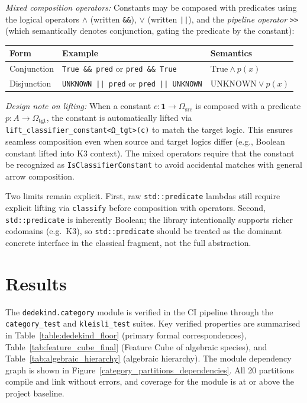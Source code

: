\documentclass[11pt, a4paper]{report}
\begin{document}
\textit{Mixed composition operators:} Constants may be composed with predicates using the logical operators $\land$ (written \texttt{\&\&}), $\lor$ (written \texttt{||}), and the \emph{pipeline operator} \texttt{>>} (which semantically denotes conjunction, gating the predicate by the constant):
\begin{center}
\begin{tabular}{lll}
\toprule
\textbf{Form} & \textbf{Example} & \textbf{Semantics} \\
\midrule
Conjunction & \texttt{True \&\& pred} or \texttt{pred \&\& True} & $\text{True} \land p(x)$ \\
Disjunction & \texttt{UNKNOWN || pred} or \texttt{pred || UNKNOWN} & $\text{UNKNOWN} \lor p(x)$ \\
\bottomrule
\end{tabular}
\end{center}

\textit{Design note on lifting:} When a constant $c : \mathbf{1} \to \Omega_{\text{src}}$ is composed with a predicate $p : A \to \Omega_{\text{tgt}}$, the constant is automatically lifted via \texttt{lift\_classifier\_constant<Ω\_tgt>(c)} to match the target logic.
This ensures seamless composition even when source and target logics differ (e.g., Boolean constant lifted into K3 context).
The mixed operators require that the constant be recognized as \texttt{IsClassifierConstant} to avoid accidental matches with general arrow composition.

Two limits remain explicit.
First, raw \texttt{std::predicate} lambdas still require explicit lifting via \texttt{classify} before composition with operators.
Second, \texttt{std::predicate} is inherently Boolean; the library intentionally supports richer codomains (e.g.\ K3), so \texttt{std::predicate} should be treated as the dominant concrete interface in the classical fragment, not the full abstraction.

\section{Results}
\label{sec:category-results}

The \texttt{dedekind.category} module is verified in the CI pipeline through the \texttt{category\_test} and \texttt{kleisli\_test} suites. Key verified properties are summarised in Table~\ref{table:dedekind_floor} (primary formal correspondences), Table~\ref{tab:feature_cube_final} (Feature Cube of algebraic species), and Table~\ref{tab:algebraic_hierarchy} (algebraic hierarchy). The module dependency graph is shown in Figure~\ref{category_partitions_dependencies}. All 20 partitions compile and link without errors, and coverage for the module is at or above the project baseline.
\end{document}
